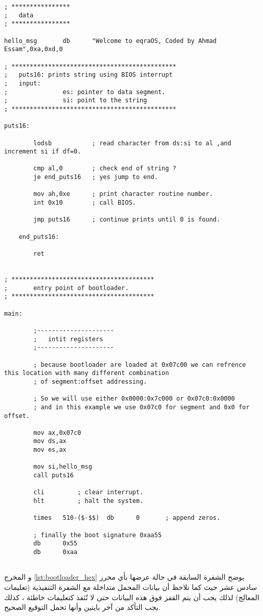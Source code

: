 \documentclass[document.tex]{subfiles}
\begin{document}
\begin{english}
\begin{lstlisting}[label=lst:bpb_bootloader,caption=BPB example]
; ****************
;	data
; ****************

hello_msg		db		"Welcome to eqraOS, Coded by Ahmad Essam",0xa,0xd,0

; *********************************************
;	puts16: prints string using BIOS interrupt
;   input:
;				es: pointer to data segment.
;				si: point to the string
; *********************************************

puts16:
		
		lodsb			; read character from ds:si to al ,and increment si if df=0.
		
		cmp al,0		; check end of string ?
		je end_puts16	; yes jump to end.
		
		mov ah,0xe		; print character routine number.
		int 0x10		; call BIOS.
		
		jmp puts16		; continue prints until 0 is found.
		
	end_puts16:
	
		ret				
		
		
; ***************************************
;		entry point of bootloader.
; ***************************************
		
main:				

		;---------------------
		;	intit registers
		;---------------------
		
		; because bootloader are loaded at 0x07c00 we can refrence this location with many different combination
		; of segment:offset addressing.
		
		; So we will use either 0x0000:0x7c000 or 0x07c0:0x0000
		; and in this example we use 0x07c0 for segment and 0x0 for offset.
		
		mov ax,0x07c0			
		mov ds,ax
		mov es,ax
		
		mov si,hello_msg
		call puts16

		cli			; clear interrupt.		
		hlt			; halt the system.
		
		times	510-($-$$)	db		0		; append zeros.
		
		; finally the boot signature 0xaa55
		db		0x55
		db		0xaa
		

\end{lstlisting}
\end{english}


و المخرج \ref{lst:bootloader_hex} يوضح الشفرة السابقة في حالة عرضها بأي محرر سادس عشر  حيث كما نلاحظ أن بيانات المحمل متداخلة مع الشفرة التنفيذية (تعليمات المعالج) لذلك يجب أن يتم القفز فوق هذه البيانات حتى لا تُنَفذ كتعليمات خاطئة ، كذلك يجب التأكد من آخر بايتين وأنها تحمل التوقيع الصحيح.
\end{document}
